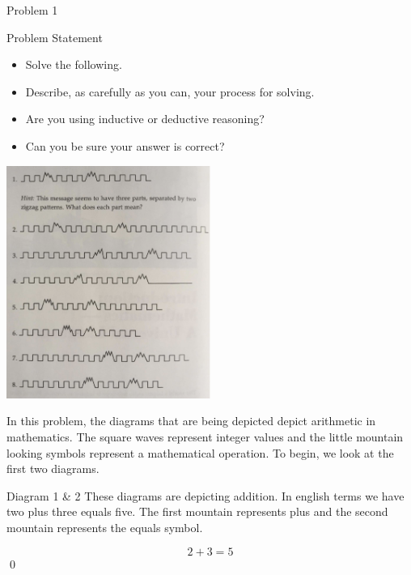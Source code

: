 \begin{problem}{Problem 1}
    \begin{statement}{Problem Statement}
        \begin{itemize}
            \item Solve the following.
            \item Describe, as carefully as you can, your process for solving.
            \item Are you using inductive or deductive reasoning?
            \item Can you be sure your answer is correct?
        \end{itemize}

        \begin{center}
            \includegraphics[width=0.5\textwidth]{./Images/Math Signals.png}
        \end{center}

    \end{statement}

    In this problem, the diagrams that are being depicted depict arithmetic in mathematics. The square waves represent integer values and the little mountain looking symbols represent a mathematical
    operation. To begin, we look at the first two diagrams.


    \begin{Highlight}{Diagram 1 \& 2}
        These diagrams are depicting addition. In english terms we have two plus three equals five. The first mountain represents plus and the second mountain represents the equals symbol.

        \setcounter{equation}{0}
        \begin{equation}
            2 + 3 = 5
        \end{equation}
        \qed


\end{Highlight}
\end{problem}
